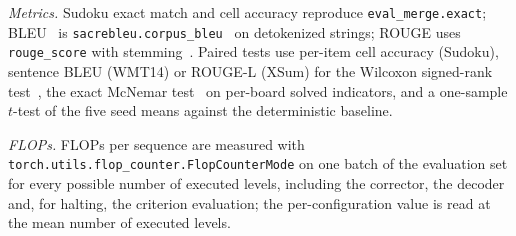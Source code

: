 \textit{Metrics.} Sudoku exact match and cell accuracy reproduce \texttt{eval\_merge.exact}; BLEU~\citep{papineni2002bleu} is \texttt{sacrebleu.corpus\_bleu}~\citep{post2018sacrebleu} on detokenized strings; ROUGE uses \texttt{rouge\_score} with stemming~\citep{lin2004rouge}. Paired tests use per-item cell accuracy (Sudoku), sentence BLEU (WMT14) or ROUGE-L (XSum) for the Wilcoxon signed-rank test~\citep{wilcoxon1945}, the exact McNemar test~\citep{mcnemar1947} on per-board solved indicators, and a one-sample $t$-test of the five seed means against the deterministic baseline.

\textit{FLOPs.} FLOPs per sequence are measured with \texttt{torch.utils.flop\_counter.FlopCounterMode} on one batch of the evaluation set for every possible number of executed levels, including the corrector, the decoder and, for halting, the criterion evaluation; the per-configuration value is read at the mean number of executed levels.
